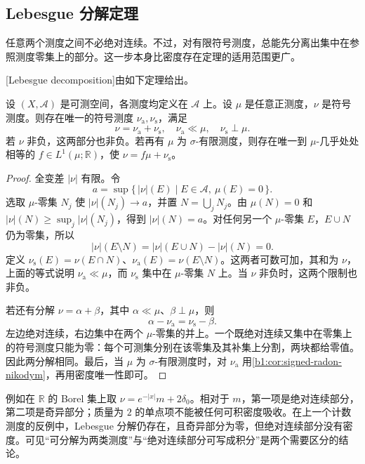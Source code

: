 \subsection{Lebesgue 分解定理}
\label{b1:subsec:060404}

任意两个测度之间不必绝对连续。不过，对有限符号测度，总能先分离出集中在参照测度零集上的部分。这一步本身比密度存在定理的适用范围更广。

\ProseParagraphBreak

[Lebesgue decomposition]由如下定理给出。

\begin{theorem}[Lebesgue 分解]\label{b1:thm:lebesgue-decomposition}
设 \((X,\mathcal A)\) 是可测空间，各测度均定义在 \(\mathcal A\) 上。设 \(\mu\) 是任意正测度，\(\nu\) 是符号测度。则存在唯一的符号测度 \(\nu_{\mathrm a},\nu_{\mathrm s}\)，满足
\[
\nu=\nu_{\mathrm a}+\nu_{\mathrm s},\quad
\nu_{\mathrm a}\ll\mu,\quad \nu_{\mathrm s}\perp\mu.
\]
若 \(\nu\) 非负，这两部分也非负。若再有 \(\mu\) 为 \(\sigma\)-有限测度，则存在唯一到 \(\mu\)-几乎处处相等的 \(f\in L^1(\mu;\mathbb R)\)，使 \(\nu=f\mu+\nu_{\mathrm s}\)。
\end{theorem}
\begin{proof}
全变差 \(|\nu|\) 有限。令
\[
a=\sup\{\,|\nu|(E)\mid E\in\mathcal A,\ \mu(E)=0\,\}.
\]
选取 \(\mu\)-零集 \(N_j\) 使 \(|\nu|(N_j)\rightarrow a\)，并置 \(N=\bigcup_jN_j\)。由 \(\mu(N)=0\) 和 \(|\nu|(N)\geq\sup_j|\nu|(N_j)\)，得到 \(|\nu|(N)=a\)。对任何另一个 \(\mu\)-零集 \(E\)，\(E\cup N\) 仍为零集，所以
\[
|\nu|(E\setminus N)=|\nu|(E\cup N)-|\nu|(N)=0.
\]
定义 \(\nu_{\mathrm s}(E)=\nu(E\cap N)\)、\(\nu_{\mathrm a}(E)=\nu(E\setminus N)\)。这两者可数可加，其和为 \(\nu\)，上面的等式说明 \(\nu_{\mathrm a}\ll\mu\)，而 \(\nu_{\mathrm s}\) 集中在 \(\mu\)-零集 \(N\) 上。当 \(\nu\) 非负时，这两个限制也非负。

若还有分解 \(\nu=\alpha+\beta\)，其中 \(\alpha\ll\mu\)、\(\beta\perp\mu\)，则
\[
\alpha-\nu_{\mathrm a}=\nu_{\mathrm s}-\beta.
\]
左边绝对连续，右边集中在两个 \(\mu\)-零集的并上。一个既绝对连续又集中在零集上的符号测度只能为零：每个可测集分别在该零集及其补集上分割，两块都给零值。因此两分解相同。最后，当 \(\mu\) 为 \(\sigma\)-有限测度时，对 \(\nu_{\mathrm a}\) 用\cref{b1:cor:signed-radon-nikodym}，再用密度唯一性即可。
\end{proof}

例如在 \(\mathbb R\) 的 Borel 集上取 \(\nu=e^{-|x|}m+2\delta_0\)。相对于 \(m\)，第一项是绝对连续部分，第二项是奇异部分；质量为 \(2\) 的单点项不能被任何可积密度吸收。在上一个计数测度的反例中，Lebesgue 分解仍存在，且奇异部分为零，但绝对连续部分没有密度。可见“可分解为两类测度”与“绝对连续部分可写成积分”是两个需要区分的结论。

